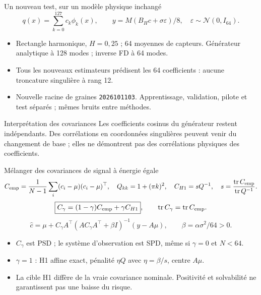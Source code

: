 \documentclass[aspectratio=169,10pt]{beamer}
\begin{document}
\begin{frame}{Un nouveau test, sur un modèle physique inchangé}
\[
q(x)=\sum_{k=0}^{127}c_k\phi_k(x),\qquad
y=M(B_Hc+\sigma\varepsilon)/8,\quad \varepsilon\sim\mathcal N(0,I_{64}).
\]
\begin{itemize}
\item Rectangle harmonique, $H=0,25$ ; 64 moyennes de capteurs. Générateur analytique à 128 modes ; inverse FD à 64 modes.
\item Tous les nouveaux estimateurs prédisent les 64 coefficients : aucune troncature singulière à rang 12.
\item Nouvelle racine de graines \texttt{2026101103}. Apprentissage, validation, pilote et test séparés ; mêmes bruits entre méthodes.
\end{itemize}
\begin{block}{Interprétation des covariances}
Les coefficients cosinus du générateur restent indépendants. Des corrélations en coordonnées singulières peuvent venir du changement de base ; elles ne démontrent pas des corrélations physiques des coefficients.
\end{block}
\end{frame}

\begin{frame}{Mélanger des covariances de signal à énergie égale}
\small
\[
C_{\rm emp}=\frac1{N-1}\sum_i(c_i-\mu)(c_i-\mu)^\top,\quad
Q_{kk}=1+(\pi k)^2,\quad
C_{H1}=sQ^{-1},\quad s=\frac{\operatorname{tr}C_{\rm emp}}{\operatorname{tr}Q^{-1}}.
\]
\[
\boxed{C_\gamma=(1-\gamma)C_{\rm emp}+\gamma C_{H1}},\qquad
\operatorname{tr}C_\gamma=\operatorname{tr}C_{\rm emp}.
\]
\[
\widehat c=\mu+C_\gamma A^\top(AC_\gamma A^\top+\beta I)^{-1}(y-A\mu),
\qquad \beta=\alpha\sigma^2/64>0.
\]
\begin{itemize}
\item $C_\gamma$ est PSD ; le système d'observation est SPD, même si $\gamma=0$ et $N<64$.
\item $\gamma=1$ : H1 affine exact, pénalité $\eta Q$ avec $\eta=\beta/s$, centre $A\mu$.
\item La cible H1 diffère de la vraie covariance nominale. Positivité et solvabilité ne garantissent pas une baisse du risque.
\end{itemize}
\end{frame}
\end{document}
